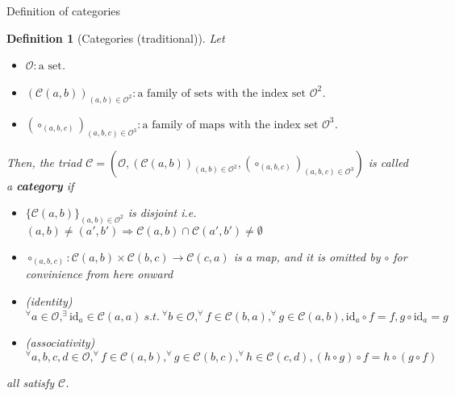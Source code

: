 \documentclass[dvipdfmx,10pt,notheorems]{beamer}
\newtheorem{definition}[theorem]{Definition}
\renewcommand{\#}{^\sharp}
\newcommand{\id}{\mbox{id}}
\begin{document}
		
	\begin{frame}{Definition of categories}
			\begin{definition}[Categories (traditional)]
					Let 
							\begin{itemize}
									\item $\mathcal{O}:\mbox{a set}$.
									\item $(\mathcal{C}(a,b))_{(a,b)\in\mathcal{O}^2}:
									\mbox{a family of sets with the index set }\mathcal{O}^2$.
									\item $(\circ_{(a,b,c)})_{(a,b,c)\in\mathcal{O}^3}:
									\mbox{a family of maps with the index set }\mathcal{O}^3$.
							\end{itemize}
					Then,
					the triad $\mathcal{C}=(\mathcal{O},(\mathcal{C}(a,b))_{(a,b)\in\mathcal{O}^2},
					(\circ_{(a,b,c)})_{(a,b,c)\in\mathcal{O}^3})$
					is called a {\bf category} if
							\begin{itemize}
									\item $\{\mathcal{C}(a,b)\}_{(a,b)\in \mathcal{O}^2}$
									is disjoint i.e. $(a,b)\neq (a',b')\Rightarrow
									\mathcal{C}(a,b)\cap\mathcal{C}(a',b')\neq\emptyset$
									\item $\circ_{(a,b,c)}:\mathcal{C}(a,b)\times\mathcal{C}(b,c)\rightarrow
									\mathcal{C}(c,a)$ is
									a map,
									and it is omitted by $\circ$ for convinience from here onward
									\item (identity)
									$^\forall a\in\mathcal{O}, ^\exists \id_a\in\mathcal{C}(a,a)~s.t.~
									^\forall b\in\mathcal{O}, ^\forall f\in\mathcal{C}(b,a),
									^\forall g\in\mathcal{C}(a,b), \id_a\circ f=f, g\circ\id_a=g$
									\item  (associativity)
									$^\forall a,b,c,d\in\mathcal{O}, ^\forall f\in\mathcal{C}(a,b),
									 ^\forall g \in \mathcal{C}(b,c), ^\forall h \in\mathcal{C}(c,d),
									(h\circ g)\circ f=h\circ (g\circ f)$
							\end{itemize}
					all satisfy $\mathcal{C}$.
			\end{definition}
	\end{frame}
\end{document}
